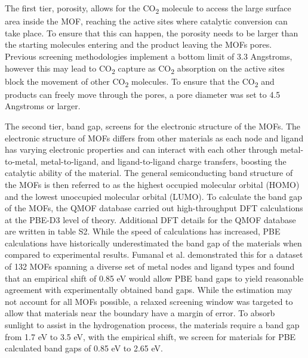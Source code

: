 \documentclass[twoside,twocolumn,9pt]{article}
\begin{document}
The first tier, porosity, allows for the CO\textsubscript{2} molecule to access the large surface area inside the MOF, reaching the active sites where catalytic conversion can take place\cite{gao_coordination_2017}. To ensure that this can happen, the porosity needs to be larger than the starting molecules entering and the product leaving the MOFs pores. Previous screening methodologies implement a bottom limit of 3.3 Angstroms\cite{hai_high-throughput_2022}, however this may lead to CO\textsubscript{2} capture as CO\textsubscript{2} absorption on the active sites block the movement of other CO\textsubscript{2} molecules\cite{li_porous_2020}. To ensure that the CO\textsubscript{2} and products can freely move through the pores, a pore diameter was set to 4.5 Angstroms or larger. 

\par

The second tier, band gap, screens for the electronic structure of the MOFs. The electronic structure of MOFs differs from other materials as each node and ligand has varying electronic properties\cite{usman_semiconductor_2017} and can interact with each other through metal-to-metal, metal-to-ligand, and ligand-to-ligand charge transfers, boosting the catalytic ability of the material\cite{li_metal-organic_2019}. The general semiconducting band structure of the MOFs is then referred to as the highest occupied molecular orbital (HOMO) and the lowest unoccupied molecular orbital (LUMO)\cite{perdew_generalized_1996}. To calculate the band gap of the MOFs, the QMOF database carried out high-throughput DFT calculations at the PBE-D3\cite{grimme_dispersion-corrected_2016} level of theory. Additional DFT details for the QMOF database are written in table S2. While the speed of calculations has increased, PBE calculations have historically underestimated the band gap of the materials when compared to experimental results\cite{rosen_high-throughput_2022}. Fumanal et al. demonstrated this for a dataset of 132 MOFs spanning a diverse set of metal nodes and ligand types and found that an empirical shift of 0.85 eV would allow PBE band gaps to yield reasonable agreement with experimentally obtained band gaps\cite{fumanal_charge_2020}. While the estimation may not account for all MOFs possible, a relaxed screening window was targeted to allow that materials near the boundary have a margin of error. To absorb sunlight to assist in the hydrogenation process, the materials require a band gap from 1.7 eV to 3.5 eV, with the empirical shift, we screen for materials for PBE calculated band gaps of 0.85 eV to 2.65 eV. 
\end{document}
